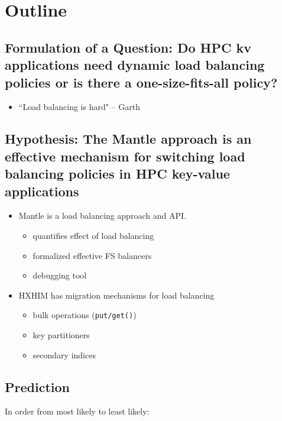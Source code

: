 \section{Outline}


\subsection{Formulation of a Question: Do HPC kv applications need dynamic load
balancing policies or is there a one-size-fits-all policy?}

\begin{itemize}
  \item ``Load balancing is hard" -- Garth
\end{itemize}

\subsection{Hypothesis: The Mantle approach is an effective mechanism for
switching load balancing policies in HPC key-value applications}

\begin{itemize}
  \item Mantle is a load balancing approach and API.
  \begin{itemize}
    \item quantifies effect of load balancing
    \item formalized effective FS balancers
    \item debugging tool 
  \end{itemize}
  \item HXHIM has migration mechanisms for load balancing
  \begin{itemize}
    \item bulk operations (\texttt{put/get()})
    \item key partitioners
    \item secondary indices
  \end{itemize}
\end{itemize}

\subsection{Prediction}

In order from most likely to least likely:

